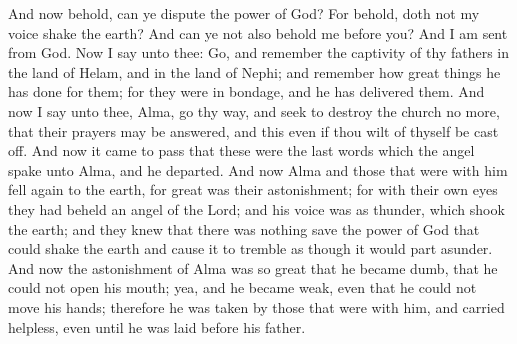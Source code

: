 And now behold, can ye dispute the power of God? For behold, doth not my voice shake the earth? And can ye not also behold me before you? And I am sent from God.
\bverse \iffalse Now I say unto thee: Go, and remember the captivity of thy fathers in the land of Helam, and in the land of Nephi; and remember how great things he has done for them; for they were in bondage, and he has delivered them. And now I say unto thee, Alma, go thy way, and seek to destroy the church no more, that their prayers may be answered, and this even if thou wilt of thyself be cast off. \fi
Now I say unto thee: Go, and remember the captivity of thy fathers in the land of Helam, and in the land of Nephi; and remember how great things he has done for them; for they were in bondage, and he has delivered them. And now I say unto thee, Alma, go thy way, and seek to destroy the church no more, that their prayers may be answered, and this even if thou wilt of thyself be cast off.
\bverse \iffalse And now it came to pass that these were the last words which the angel spake unto Alma, and he departed. \fi
And now it came to pass that these were the last words which the angel spake unto Alma, and he departed.
\bverse \iffalse And now Alma and those that were with him fell again to the earth, for great was their astonishment; for with their own eyes they had beheld an angel of the Lord; and his voice was as thunder, which shook the earth; and they knew that there was nothing save the power of God that could shake the earth and cause it to tremble as though it would part asunder. \fi
And now Alma and those that were with him fell again to the earth, for great was their astonishment; for with their own eyes they had beheld an angel of the Lord; and his voice was as thunder, which shook the earth; and they knew that there was nothing save the power of God that could shake the earth and cause it to tremble as though it would part asunder.
\bverse \iffalse And now the astonishment of Alma was so great that he became dumb, that he could not open his mouth; yea, and he became weak, even that he could not move his hands; therefore he was taken by those that were with him, and carried helpless, even until he was laid before his father. \fi
And now the astonishment of Alma was so great that he became dumb, that he could not open his mouth; yea, and he became weak, even that he could not move his hands; therefore he was taken by those that were with him, and carried helpless, even until he was laid before his father.
\bverse \iffalse And they rehearsed unto his father all that had happened unto them; and his father rejoiced, for he knew that it was the power of God. \fi
